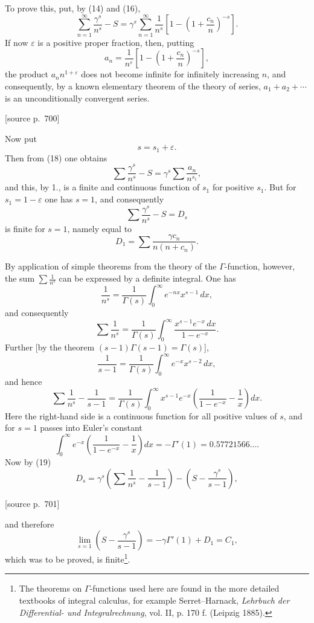 \documentclass[11pt]{article}
\newcommand{\srcpage}[1]{\par\medskip\noindent\textsf{[source p.~#1]}\par\smallskip}
\begin{document}
To prove this, put, by (14) and (16),
\begin{equation}
\sum_{n=1}^{\infty}\frac{\gamma^s}{n^s}-S
=\gamma^s\sum_{n=1}^{\infty}\frac1{n^s}
\left[1-\left(1+\frac{c_n}{n}\right)^{-s}\right].
\tag{18}
\end{equation}
If now $\varepsilon$ is a positive proper fraction, then, putting
\[
a_n=\frac1{n^\varepsilon}\left[1-\left(1+\frac{c_n}{n}\right)^{-s}\right],
\]
the product $a_n n^{1+\varepsilon}$ does not become infinite for infinitely increasing $n$, and consequently, by a known elementary theorem of the theory of series, $a_1+a_2+\cdots$ is an unconditionally convergent series.

\srcpage{700}
Now put
\[
s=s_1+\varepsilon.
\]
Then from (18) one obtains
\[
\sum\frac{\gamma^s}{n^s}-S=\gamma^s\sum\frac{a_n}{n^{s_1}},
\]
and this, by 1., is a finite and continuous function of $s_1$ for positive $s_1$. But for $s_1=1-\varepsilon$ one has $s=1$, and consequently
\begin{equation}
\sum\frac{\gamma^s}{n^s}-S=D_s
\tag{19}
\end{equation}
is finite for $s=1$, namely equal to
\[
D_1=\sum\frac{\gamma c_n}{n(n+c_n)}.
\]

By application of simple theorems from the theory of the $\Gamma$-function, however, the sum $\sum\frac1{n^s}$ can be expressed by a definite integral. One has
\[
\frac1{n^s}=\frac1{\Gamma(s)}\int_0^\infty e^{-nx}x^{s-1}\,dx,
\]
and consequently
\[
\sum\frac1{n^s}=\frac1{\Gamma(s)}\int_0^\infty \frac{x^{s-1}e^{-x}\,dx}{1-e^{-x}}.
\]
Further [by the theorem $(s-1)\Gamma(s-1)=\Gamma(s)$],
\[
\frac1{s-1}=\frac1{\Gamma(s)}\int_0^\infty e^{-x}x^{s-2}\,dx,
\]
and hence
\[
\sum\frac1{n^s}-\frac1{s-1}
=\frac1{\Gamma(s)}\int_0^\infty x^{s-1}e^{-x}
\left(\frac1{1-e^{-x}}-\frac1x\right)dx.
\]
Here the right-hand side is a continuous function for all positive values of $s$, and for $s=1$ passes into Euler's constant
\[
\int_0^\infty e^{-x}\left(\frac1{1-e^{-x}}-\frac1x\right)dx
=-\Gamma'(1)=0.57721566\ldots .
\]
Now by (19)
\[
D_s=\gamma^s\left(\sum\frac1{n^s}-\frac1{s-1}\right)
-\left(S-\frac{\gamma^s}{s-1}\right),
\]

\srcpage{701}
and therefore
\begin{equation}
\lim_{s=1}\left(S-\frac{\gamma^s}{s-1}\right)
=-\gamma\Gamma'(1)+D_1=C_1,
\tag{20}
\end{equation}
which was to be proved, is finite\footnote{The theorems on $\Gamma$-functions used here are found in the more detailed textbooks of integral calculus, for example Serret--Harnack, \emph{Lehrbuch der Differential- und Integralrechnung}, vol. II, p. 170 f. (Leipzig 1885).}.
\end{document}
